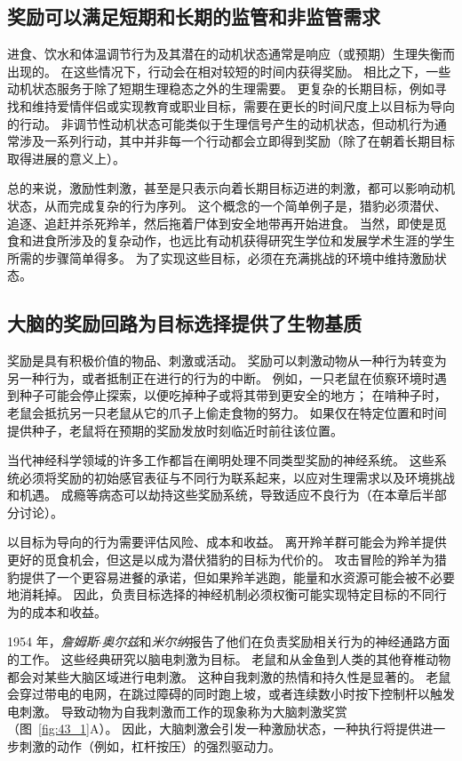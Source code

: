 \subsection{奖励可以满足短期和长期的监管和非监管需求}

进食、饮水和体温调节行为及其潜在的动机状态通常是响应（或预期）生理失衡而出现的。
在这些情况下，行动会在相对较短的时间内获得奖励。
相比之下，一些动机状态服务于除了短期生理稳态之外的生理需要。
更复杂的长期目标，例如寻找和维持爱情伴侣或实现教育或职业目标，需要在更长的时间尺度上以目标为导向的行动。
非调节性动机状态可能类似于生理信号产生的动机状态，但动机行为通常涉及一系列行动，其中并非每一个行动都会立即得到奖励（除了在朝着长期目标取得进展的意义上）。


总的来说，激励性刺激，甚至是只表示向着长期目标迈进的刺激，都可以影响动机状态，从而完成复杂的行为序列。
这个概念的一个简单例子是，猎豹必须潜伏、追逐、追赶并杀死羚羊，然后拖着尸体到安全地带再开始进食。
当然，即使是觅食和进食所涉及的复杂动作，也远比有动机获得研究生学位和发展学术生涯的学生所需的步骤简单得多。
为了实现这些目标，必须在充满挑战的环境中维持激励状态。



\subsection{大脑的奖励回路为目标选择提供了生物基质}

奖励是具有积极价值的物品、刺激或活动。
奖励可以刺激动物从一种行为转变为另一种行为，或者抵制正在进行的行为的中断。
例如，一只老鼠在侦察环境时遇到种子可能会停止探索，以便吃掉种子或将其带到更安全的地方；
在啃种子时，老鼠会抵抗另一只老鼠从它的爪子上偷走食物的努力。
如果仅在特定位置和时间提供种子，老鼠将在预期的奖励发放时刻临近时前往该位置。


当代神经科学领域的许多工作都旨在阐明处理不同类型奖励的神经系统。
这些系统必须将奖励的初始感官表征与不同行为联系起来，以应对生理需求以及环境挑战和机遇。
成瘾等病态可以劫持这些奖励系统，导致适应不良行为（在本章后半部分讨论）。


以目标为导向的行为需要评估风险、成本和收益。
离开羚羊群可能会为羚羊提供更好的觅食机会，但这是以成为潜伏猎豹的目标为代价的。
攻击冒险的羚羊为猎豹提供了一个更容易进餐的承诺，但如果羚羊逃跑，能量和水资源可能会被不必要地消耗掉。
因此，负责目标选择的神经机制必须权衡可能实现特定目标的不同行为的成本和收益。


1954 年，\textit{詹姆斯$\cdot$奥尔兹}和\textit{米尔纳}报告了他们在负责奖励相关行为的神经通路方面的工作。
这些经典研究以脑电刺激为目标。
老鼠和从金鱼到人类的其他脊椎动物都会对某些大脑区域进行电刺激。
这种自我刺激的热情和持久性是显著的。
老鼠会穿过带电的电网，在跳过障碍的同时跑上坡，或者连续数小时按下控制杆以触发电刺激。
导致动物为自我刺激而工作的现象称为大脑刺激奖赏（图~\ref{fig:43_1}A）。
因此，大脑刺激会引发一种激励状态，一种执行将提供进一步刺激的动作（例如，杠杆按压）的强烈驱动力。


